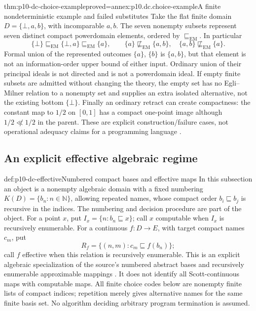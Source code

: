 \begin{hbtheorem}{thm:p10-dc-choice-example}{proved=annex:p10.dc.choice-example}{A finite nondeterministic example and failed substitutes}
Take the flat finite domain \(D=\{\bot,a,b\}\), with incomparable
\(a,b\). The seven nonempty subsets represent seven distinct compact
powerdomain elements, ordered by \(\sqsubseteq_{\mathrm{EM}}\).
In particular
\[
 \{\bot\}\sqsubseteq_{\mathrm{EM}}\{\bot,a\}
 \sqsubseteq_{\mathrm{EM}}\{a\},\qquad
 \{a\}\not\sqsubseteq_{\mathrm{EM}}\{a,b\},
 \quad\{a,b\}\not\sqsubseteq_{\mathrm{EM}}\{a\}.
\]
Formal union of the represented outcomes \(\{a\}\), \(\{b\}\)
is \(\{a,b\}\), but that element is not an information-order
upper bound of either input. Ordinary union of their principal ideals
is not directed and is not a powerdomain ideal.
If empty finite subsets are admitted without changing the theory,
the empty set has no Egli--Milner relation to a nonempty set and supplies
an extra isolated alternative, not the existing bottom \(\{\bot\}\).
Finally an ordinary retract can create compactness: the constant map
to \(1/2\) on \([0,1]\) has a compact one-point image although
\(1/2\not\ll1/2\) in the parent.
These are explicit construction/failure cases, not operational
adequacy claims for a programming language
\cite[pp.~35--36,93--96]{AbramskyJungCorrectedExpandedDomainTheory}.
\end{hbtheorem}

\subsection{An explicit effective algebraic regime}

\begin{hbdefinition}{def:p10-dc-effective}{Numbered compact bases and effective maps}
In this subsection an object is a nonempty algebraic domain with a
fixed numbering \(K(D)=\{b_n:n\in\mathbb N\}\), allowing repeated
names, whose compact order \(b_i\sqsubseteq b_j\) is recursive in
the indices. The numbering and decision procedure are part of the object.
For a point \(x\), put \(I_x=\{n:b_n\sqsubseteq x\}\); call
\(x\) computable when \(I_x\) is recursively enumerable.
For a continuous \(f:D\to E\), with target compact names \(c_m\),
put
\[
 R_f=\{(n,m):c_m\sqsubseteq f(b_n)\};
\]
call \(f\) effective when this relation is recursively enumerable.
This is an explicit algebraic specialization of the source's numbered
abstract bases and recursively enumerable approximable mappings
\cite[Section~8.1.1, p.~145]{AbramskyJungCorrectedExpandedDomainTheory}.
It does not identify all Scott-continuous maps with computable maps.
All finite choice codes below are nonempty finite lists of compact
indices; repetition merely gives alternative names for the same finite
basis set. No algorithm deciding arbitrary program termination is assumed.
\end{hbdefinition}


